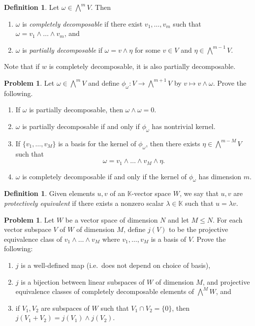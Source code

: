 \documentclass[letterpaper,11pt]{amsart}
\theoremstyle{plain}
\theoremstyle{definition}
\newtheorem{defn}[thm]{Definition}
\newtheorem{pr}[thm]{Problem}
\theoremstyle{remark}
\begin{document}
\begin{defn}
    Let $\omega \in \bigwedge^m V$. Then
    \begin{enumerate}
        \item $\omega$ is \emph{completely decomposable} if there exist $v_1,\dots,v_m$ such that $\omega = v_1 \wedge \dots \wedge v_m$, and
        \item $\omega$ is \emph{partially decomposable} if $\omega = v \wedge \eta$ for some $v \in V$ and $\eta \in \bigwedge^{m-1} V$.
    \end{enumerate}
    Note that if $w$ is completely decomposable, it is also partially decomposable.
\end{defn}

\begin{pr}
    Let $\omega \in \bigwedge^m V$ and define $\phi_\omega: V\rightarrow \bigwedge^{m+1}V$ by $v\mapsto v\wedge \omega$.
    Prove the following.
    \begin{enumerate}
        \item If $\omega$ is partially decomposable, then $\omega \wedge \omega = 0$.
        \item $\omega$ is partially decomposable if and only if $\phi_\omega$ has nontrivial kernel.
        \item If $\{v_1,\dots,v_M\}$ is a basis for the kernel of $\phi_\omega$, then there exists $\eta \in \bigwedge^{m-M} V$ such that
        \[
            \omega = v_1 \wedge \dots \wedge v_M \wedge \eta.
        \]
        \item $\omega$ is completely decomposable if and only if the kernel of $\phi_\omega$ has dimension $m$.
    \end{enumerate}
\end{pr}

\begin{defn}
    Given elements $u,v$ of an $\mathbb{K}$-vector space $W$, we say that $u,v$ are \emph{protectively equivalent} if there exists a nonzero scalar $\lambda \in \mathbb{K}$ such that $u = \lambda v$.
\end{defn}

\begin{pr}
    Let $W$ be a vector space of dimension $N$ and let $M \le N$.
    For each vector subspace $V$ of $W$ of dimension $M$, define $j(V)$ to be the projective equivalence class of
    $v_1 \wedge \dots \wedge v_M$ where $v_1,\dots,v_M$ is a basis of $V$.
    Prove the following:
    \begin{enumerate}
        \item $j$ is a well-defined map (i.e.~does not depend on choice of basis),
        \item $j$ is a bijection between linear subspaces of $W$ of dimension $M$, and projective equivalence classes of completely decomposable elements of $\bigwedge^M W$, and
        \item if $V_1,V_2$ are subspaces of $W$ such that $V_1\cap V_2 = \{0\}$, then $j(V_1 + V_2) = j(V_1)\wedge j(V_2)$.
    \end{enumerate}
\end{pr}
\end{document}
